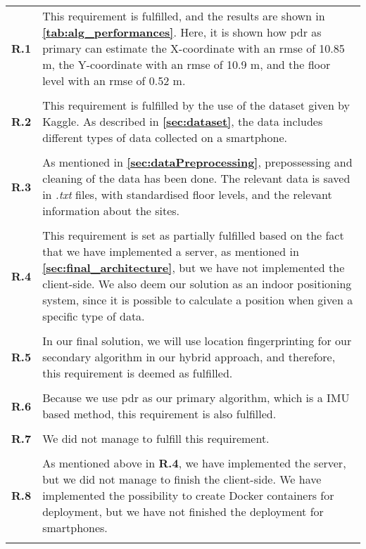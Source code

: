\begin{longtable}{p{} p{}}

\textbf{R.1} & This requirement is fulfilled, and the results are shown in \textbf{\autoref{tab:alg_performances}}. Here, it is shown how \gls{pdr} as primary can estimate the X-coordinate with an \gls{rmse} of 10.85 m, the Y-coordinate with an \gls{rmse} of 10.9 m, and the floor level with an \gls{rmse} of 0.52 m.
\\\\

\textbf{R.2} & This requirement is fulfilled by the use of the dataset given by Kaggle. As described in \textbf{\autoref{sec:dataset}}, the data includes different types of data collected on a smartphone.
\\\\

\textbf{R.3} & As mentioned in \textbf{\autoref{sec:dataPreprocessing}}, prepossessing and cleaning of the data has been done. The relevant data is saved in \textit{.txt} files, with standardised floor levels, and the relevant information about the sites. 
\\\\

\textbf{R.4} & This requirement is set as partially fulfilled based on the fact that we have implemented a server, as mentioned in \textbf{\autoref{sec:final_architecture}}, but we have not implemented the client-side. We also deem our solution as an indoor positioning system, since it is possible to calculate a position when given a specific type of data. 
\\\\

\textbf{R.5} & In our final solution, we will use location fingerprinting for our secondary algorithm in our hybrid approach, and therefore, this requirement is deemed as fulfilled.
\\\\

\textbf{R.6} & Because we use \gls{pdr} as our primary algorithm, which is a IMU based method, this requirement is also fulfilled.
\\\\

\textbf{R.7} & We did not manage to fulfill this requirement. 
\\\\

\textbf{R.8} & As mentioned above in \textbf{R.4}, we have implemented the server, but we did not manage to finish the client-side. We have implemented the possibility to create Docker containers for deployment, but we have not finished the deployment for smartphones. 
\\\\

\end{longtable}
\vspace{-24pt}

